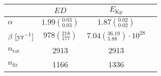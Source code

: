 \begin{tabular}{lccr}
\hline
  &                               $ED$ &                                  $E_\mathrm{Kp}$ \\
\hline
$\alpha$            &  $1.99\left(^{0.03}_{0.03}\right)$ &                $1.87\left(^{0.02}_{0.02}\right)$ \\
$\beta$ [yr$^{-1}$] &     $978\left(^{218}_{177}\right)$ &  $7.04\left(^{36.19}_{5.88}\right)\cdot 10^{28}$ \\
$n_\mathrm{tot}$    &                               2913 &                                             2913 \\
$n_\mathrm{fit}$    &                               1166 &                                             1336 \\
\hline

\end{tabular}
